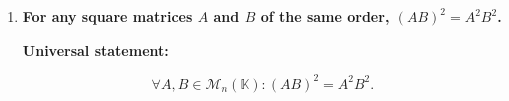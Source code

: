 \begin{enumerate}[label=\alph*)]
\begin{answer}
    $$
    A^2
    =\begin{bmatrix}
        0 & 1 \\
        0 & 0
    \end{bmatrix}
    \begin{bmatrix}
        0 & 1 \\
        0 & 0
    \end{bmatrix} =0_2
    $$

    Thus,

    $$
    \exists k=2\in\mathbb{N}^+:
    A^k=0_2,
    \quad A\neq0_2.
    $$

    Therefore, the statement is false.

    \par\bigskip
    \noindent\textbf{Sufficient condition:}

    Suppose $A$ is idempotent, i.e.,

    $$
    A^2=A.
    $$

    By mathematical induction,

    $$
    \forall p\in\mathbb{N}^+:
    A^p=A.
    $$

    Indeed, the base case $A^1=A$ holds.
    Assuming $A^p=A$ for some $p\geq1$,
    multiplying by $A$ gives

    $$
    \begin{aligned}
        A^{p+1}
        &=A^pA \\
        &=AA \\
        &=A^2 \\
        &=A.
    \end{aligned}
    $$

    Now, if

    $$
    \exists k\in\mathbb{N}^+:
    A^k=0_n,
    $$

    then, since $A^k=A$,

    $$
    A=A^k=0_n.
    $$

    Therefore,

    $$
    \boxed{A=0_n}.
    $$

    A matrix that is both idempotent and nilpotent must be zero.
\end{answer}


\item {\bfseries\boldmath
    For any square matrices $A$ and $B$
    of the same order, $(AB)^2=A^2B^2$.
}

\begin{answer}
    \textbf{Universal statement:}

    $$
    \forall A,B\in\mathcal{M}_n(\mathbb{K}):
    (AB)^2=A^2B^2.
    $$


\end{answer}
\end{enumerate}
